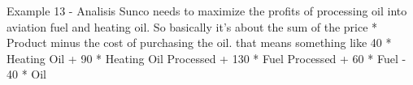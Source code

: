 \begin{frame}{Example 13 - Analisis}
Sunco needs to maximize the profits of processing oil into aviation fuel and heating oil.
So basically it's about the sum of the price *  Product minus the cost of purchasing the oil.
that means something like 40 * Heating Oil + 90 * Heating Oil Processed + 130 * Fuel Processed
+ 60 * Fuel - 40 * Oil
\end{frame}
